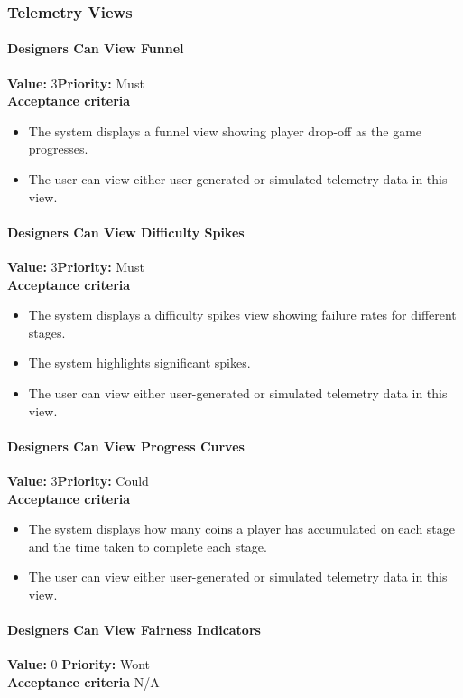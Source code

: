 \subsubsection{Telemetry Views}

\paragraph{Designers Can View Funnel}
\textbf{Value:} 3\quad \textbf{Priority:} Must\\
\textbf{Acceptance criteria}
\begin{itemize}
  \item The system displays a funnel view showing player drop-off as the game progresses.
  \item The user can view either user-generated or simulated telemetry data in this view.
\end{itemize}

\paragraph{Designers Can View Difficulty Spikes}
\textbf{Value:} 3\quad \textbf{Priority:} Must\\
\textbf{Acceptance criteria}
\begin{itemize}
  \item The system displays a difficulty spikes view showing failure rates for different stages.
  \item The system highlights significant spikes.
  \item The user can view either user-generated or simulated telemetry data in this view.
\end{itemize}

\paragraph{Designers Can View Progress Curves}
\textbf{Value:} 3\quad \textbf{Priority:} Could\\
\textbf{Acceptance criteria}
\begin{itemize}
  \item The system displays how many coins a player has accumulated on each stage and the time taken to complete each stage.
  \item The user can view either user-generated or simulated telemetry data in this view.
\end{itemize}

\paragraph{Designers Can View Fairness Indicators}
\textbf{Value:} 0 \quad \textbf{Priority:} Wont\\
\textbf{Acceptance criteria} N/A

